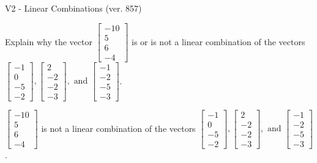 \begin{exercise}
  \begin{exerciseTitle}V2 - Linear Combinations (ver. 857)\end{exerciseTitle}
  \begin{exerciseStatement}
    Explain why the vector \(\left[\begin{array}{c}
-10 \\
5 \\
6 \\
-4
\end{array}\right]\)  is or is not a linear 
	combination of the vectors \(\left[\begin{array}{c}
-1 \\
0 \\
-5 \\
-2
\end{array}\right] , \left[\begin{array}{c}
2 \\
-2 \\
-2 \\
-3
\end{array}\right] , \text{ and } \left[\begin{array}{c}
-1 \\
-2 \\
-5 \\
-3
\end{array}\right]\).
	


  \end{exerciseStatement}
  \begin{exerciseAnswer}
   \(\left[\begin{array}{c}
-10 \\
5 \\
6 \\
-4
\end{array}\right]\) 
  	 is not  
	a linear combination of the vectors \(\left[\begin{array}{c}
-1 \\
0 \\
-5 \\
-2
\end{array}\right] , \left[\begin{array}{c}
2 \\
-2 \\
-2 \\
-3
\end{array}\right] , \text{ and } \left[\begin{array}{c}
-1 \\
-2 \\
-5 \\
-3
\end{array}\right]\).

	
  


  \end{exerciseAnswer}
\end{exercise}